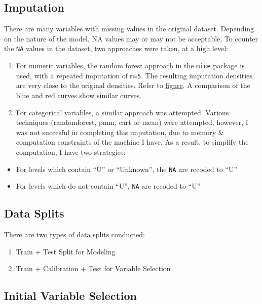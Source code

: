 \documentclass[10pt,]{article}
\providecommand{\tightlist}{%
  \setlength{\itemsep}{0pt}\setlength{\parskip}{0pt}}
\begin{document}
\subsection{Imputation}\label{imputation}

There are many variables with missing values in the original dataset.
Depending on the nature of the model, NA values may or may not be
acceptable. To counter the \texttt{NA} values in the dataset, two
approaches were taken, at a high level:

\begin{enumerate}
\def\labelenumi{\arabic{enumi}.}
\tightlist
\item
  For numeric variables, the random forest approach in the \texttt{mice}
  package is used, with a repeated imputation of \texttt{m=5}. The
  resulting imputation densities are very close to the original
  densities. Refer to \protect\hyperlink{impute_num}{figure}. A
  comparison of the blue and red curves show similar curves.
\item
  For categorical variables, a similar approach was attempted. Various
  techniques (randomforest, pmm, cart or mean) were attempted, however,
  I was not succesful in completing this imputation, due to memory \&
  computation constraints of the machine I have. As a result, to
  simplify the computation, I have two strategies:
\end{enumerate}

\begin{itemize}
\tightlist
\item
  For levels which contain ``U'' or ``Unknown'', the \texttt{NA} are
  recoded to ``U''
\item
  For levels which do not contain ``U'', \texttt{NA} are recoded to
  ``U''
\end{itemize}

\subsection{Data Splits}\label{data-splits}

There are two types of data splits conducted:

\begin{enumerate}
\def\labelenumi{\arabic{enumi}.}
\item
  Train + Test Split for Modeling
\item
  Train + Calibration + Test for Variable Selection
\end{enumerate}

\subsection{Initial Variable
Selection}\label{initial-variable-selection}
\end{document}
